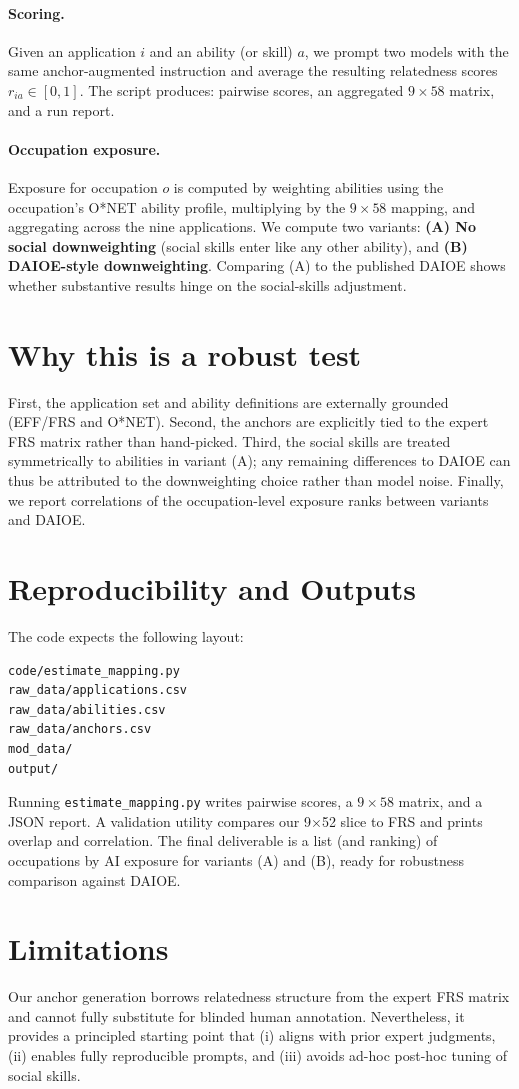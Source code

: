 \documentclass[11pt]{article}
\begin{document}
\paragraph{Scoring.} Given an application $i$ and an ability (or skill) $a$, we prompt two models with the same anchor-augmented instruction and average the resulting relatedness scores $r_{ia}\in[0,1]$. The script produces: pairwise scores, an aggregated $9\times 58$ matrix, and a run report.

\paragraph{Occupation exposure.} Exposure for occupation $o$ is computed by weighting abilities using the occupation's O*NET ability profile, multiplying by the $9\times 58$ mapping, and aggregating across the nine applications. We compute two variants: \textbf{(A) No social downweighting} (social skills enter like any other ability), and \textbf{(B) DAIOE-style downweighting}. Comparing (A) to the published DAIOE shows whether substantive results hinge on the social-skills adjustment.

\section{Why this is a robust test}
First, the application set and ability definitions are externally grounded (EFF/FRS and O*NET). Second, the anchors are explicitly tied to the expert FRS matrix rather than hand-picked. Third, the social skills are treated symmetrically to abilities in variant (A); any remaining differences to DAIOE can thus be attributed to the downweighting choice rather than model noise. Finally, we report correlations of the occupation-level exposure ranks between variants and DAIOE.

\section{Reproducibility and Outputs}
The code expects the following layout:
\begin{verbatim}
code/estimate_mapping.py
raw_data/applications.csv
raw_data/abilities.csv
raw_data/anchors.csv
mod_data/
output/
\end{verbatim}
Running \texttt{estimate\_mapping.py} writes pairwise scores, a $9\times 58$ matrix, and a JSON report. A validation utility compares our 9$\times$52 slice to FRS and prints overlap and correlation. The final deliverable is a list (and ranking) of occupations by AI exposure for variants (A) and (B), ready for robustness comparison against DAIOE.

\section{Limitations}
Our anchor generation borrows relatedness structure from the expert FRS matrix and cannot fully substitute for blinded human annotation. Nevertheless, it provides a principled starting point that (i) aligns with prior expert judgments, (ii) enables fully reproducible prompts, and (iii) avoids ad-hoc post-hoc tuning of social skills.
\end{document}
